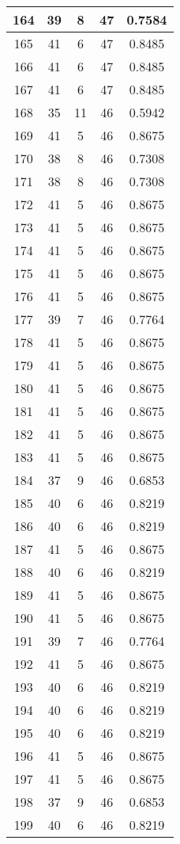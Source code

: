 \documentclass[letterpaper, 12pt]{article}
\begin{document}
\begin{longtable}{|c|c|c|c|c|}
\hline
164 & 39 & 8 & 47 & 0.7584 \\
\hline
165 & 41 & 6 & 47 & 0.8485 \\
\hline
166 & 41 & 6 & 47 & 0.8485 \\
\hline
167 & 41 & 6 & 47 & 0.8485 \\
\hline
168 & 35 & 11 & 46 & 0.5942 \\
\hline
169 & 41 & 5 & 46 & 0.8675 \\
\hline
170 & 38 & 8 & 46 & 0.7308 \\
\hline
171 & 38 & 8 & 46 & 0.7308 \\
\hline
172 & 41 & 5 & 46 & 0.8675 \\
\hline
173 & 41 & 5 & 46 & 0.8675 \\
\hline
174 & 41 & 5 & 46 & 0.8675 \\
\hline
175 & 41 & 5 & 46 & 0.8675 \\
\hline
176 & 41 & 5 & 46 & 0.8675 \\
\hline
177 & 39 & 7 & 46 & 0.7764 \\
\hline
178 & 41 & 5 & 46 & 0.8675 \\
\hline
179 & 41 & 5 & 46 & 0.8675 \\
\hline
180 & 41 & 5 & 46 & 0.8675 \\
\hline
181 & 41 & 5 & 46 & 0.8675 \\
\hline
182 & 41 & 5 & 46 & 0.8675 \\
\hline
183 & 41 & 5 & 46 & 0.8675 \\
\hline
184 & 37 & 9 & 46 & 0.6853 \\
\hline
185 & 40 & 6 & 46 & 0.8219 \\
\hline
186 & 40 & 6 & 46 & 0.8219 \\
\hline
187 & 41 & 5 & 46 & 0.8675 \\
\hline
188 & 40 & 6 & 46 & 0.8219 \\
\hline
189 & 41 & 5 & 46 & 0.8675 \\
\hline
190 & 41 & 5 & 46 & 0.8675 \\
\hline
191 & 39 & 7 & 46 & 0.7764 \\
\hline
192 & 41 & 5 & 46 & 0.8675 \\
\hline
193 & 40 & 6 & 46 & 0.8219 \\
\hline
194 & 40 & 6 & 46 & 0.8219 \\
\hline
195 & 40 & 6 & 46 & 0.8219 \\
\hline
196 & 41 & 5 & 46 & 0.8675 \\
\hline
197 & 41 & 5 & 46 & 0.8675 \\
\hline
198 & 37 & 9 & 46 & 0.6853 \\
\hline
199 & 40 & 6 & 46 & 0.8219 \\
\hline
\end{longtable}
\end{document}
